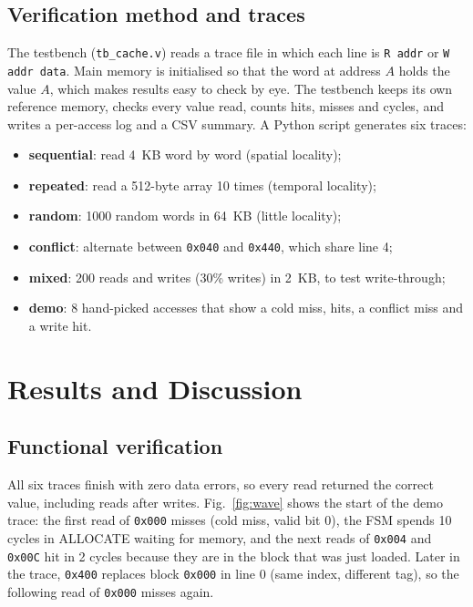\documentclass[conference]{IEEEtran}
\begin{document}
\subsection{Verification method and traces}
The testbench (\texttt{tb\_cache.v}) reads a trace file in which each line is \texttt{R addr} or
\texttt{W addr data}. Main memory is initialised so that the word at address $A$ holds the value $A$, which makes
results easy to check by eye. The testbench keeps its own reference memory, checks every value read, counts hits,
misses and cycles, and writes a per-access log and a CSV summary. A Python script generates six traces:
\begin{itemize}
\item \textbf{sequential}: read 4~KB word by word (spatial locality);
\item \textbf{repeated}: read a 512-byte array 10 times (temporal locality);
\item \textbf{random}: 1000 random words in 64~KB (little locality);
\item \textbf{conflict}: alternate between \texttt{0x040} and \texttt{0x440}, which share line 4;
\item \textbf{mixed}: 200 reads and writes (30\% writes) in 2~KB, to test write-through;
\item \textbf{demo}: 8 hand-picked accesses that show a cold miss, hits, a conflict miss and a write hit.
\end{itemize}

\section{Results and Discussion}

\subsection{Functional verification}
All six traces finish with zero data errors, so every read returned the correct value, including reads after
writes. Fig.~\ref{fig:wave} shows the start of the demo trace: the first read of \texttt{0x000} misses (cold
miss, valid bit 0), the FSM spends 10 cycles in ALLOCATE waiting for memory, and the next reads of \texttt{0x004}
and \texttt{0x00C} hit in 2 cycles because they are in the block that was just loaded. Later in the trace,
\texttt{0x400} replaces block \texttt{0x000} in line 0 (same index, different tag), so the following read of
\texttt{0x000} misses again.
\end{document}
